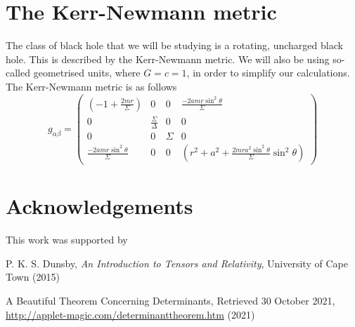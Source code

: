 \documentclass[11pt]{article}
\numberwithin{equation}{section}
\numberwithin{figure}{section}
\numberwithin{table}{section}
\begin{document}
\section{The Kerr-Newmann metric}\label{sec:Kerr-Newmann}
\par The class of black hole that we will be studying is a rotating, uncharged black hole. This is described by the Kerr-Newmann metric. We will also be using so-called geometrised units, where $G=c=1$, in order to simplify our calculations. The Kerr-Newmann metric is as follows
\begin{equation}
    g_{\alpha\beta}=
    \begin{pmatrix}
        (-1+\frac{2mr}{\Sigma}) & 0 & 0 & \frac{-2amr\sin^2\theta}{\Sigma} \\
        0 & \frac{\Sigma}{\Delta} & 0 & 0 \\
        0 & 0 & \Sigma & 0 \\
        \frac{-2amr\sin^2\theta}{\Sigma} & 0 & 0 & \left(r^2+a^2+\frac{2mra^2\sin^2\theta}{\Sigma}\sin^2\theta\right)
    \end{pmatrix}
\end{equation}




\section*{Acknowledgements}
This work was supported by


\begin{thebibliography}{9}
    P. K. S. Dunsby, \textit{An Introduction to Tensors and Relativity}, University of Cape Town (2015)

    A Beautiful Theorem Concerning Determinants, Retrieved 30 October 2021, \url{http://applet-magic.com/determinanttheorem.htm} (2021)
\end{thebibliography}
    
\end{document}
